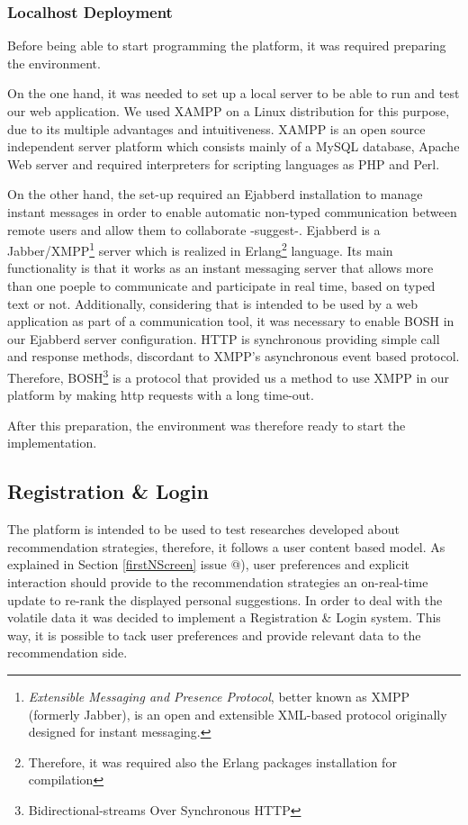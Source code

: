 \documentclass{acm_proc_article-sp}
\makeatletter
\newcommand*{\rom}[1]{\expandafter\@slowromancap\romannumeral #1@}
\makeatother
\begin{document}
\subsubsection{Localhost Deployment}

Before being able to start programming the platform, it was required preparing the environment. 

On the one hand, it was needed to set up a local server to be able to run and test our web application. We used XAMPP on a Linux distribution for this purpose, due to its multiple advantages and intuitiveness. XAMPP is an open source independent server platform which consists mainly of a MySQL database, Apache Web server and required interpreters for scripting languages as PHP and Perl. 

On the other hand, the set-up required an Ejabberd installation to manage instant messages in order to enable automatic non-typed communication between remote users and allow them to collaborate -suggest-. Ejabberd is a Jabber/XMPP\footnote{\textit{Extensible Messaging and Presence Protocol}, better known as XMPP (formerly Jabber), is an open and extensible XML-based protocol originally designed for instant messaging.} server \cite{jia2010xmpp} which is realized in Erlang\footnote{Therefore, it was required also the Erlang packages installation for compilation} language. Its main functionality is that it works as an instant messaging server that allows more than one poeple to communicate and participate in real time, based on typed text or not. Additionally, considering that is intended to be used by a web application as part of a communication tool, it was necessary to enable BOSH in our Ejabberd server configuration. HTTP is synchronous providing simple call and response methods, discordant to XMPP's asynchronous event based protocol. Therefore, BOSH\footnote{Bidirectional-streams Over Synchronous HTTP} is a protocol that provided us a method to use XMPP in our platform by making http requests with a long time-out.

After this preparation, the environment was therefore ready to start the implementation. 
\subsection{Registration \& Login}

The platform is intended to be used to test researches developed about recommendation strategies, therefore, it follows a user content based model. As explained in Section \ref{firstNScreen} issue \rom{1}), user preferences and explicit interaction should provide to the recommendation strategies an on-real-time update to re-rank the displayed personal suggestions. In order to deal with the volatile data it was decided to implement a Registration \& Login system. This way, it is possible to tack user preferences and provide relevant data to the recommendation side. 
\end{document}
